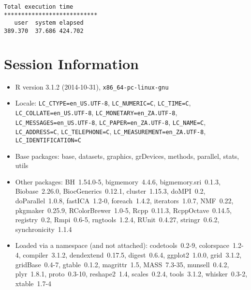 \documentclass[10pt]{article}\usepackage[]{graphicx}\usepackage[]{color}
\begin{document}
\begin{verbatim}
Total execution time
***************************
   user  system elapsed 
389.370  37.686 424.702 

\end{verbatim}

\section*{Session Information}
\begin{itemize}\raggedright
  \item R version 3.1.2 (2014-10-31), \verb|x86_64-pc-linux-gnu|
  \item Locale: \verb|LC_CTYPE=en_US.UTF-8|, \verb|LC_NUMERIC=C|, \verb|LC_TIME=C|, \verb|LC_COLLATE=en_US.UTF-8|, \verb|LC_MONETARY=en_ZA.UTF-8|, \verb|LC_MESSAGES=en_US.UTF-8|, \verb|LC_PAPER=en_ZA.UTF-8|, \verb|LC_NAME=C|, \verb|LC_ADDRESS=C|, \verb|LC_TELEPHONE=C|, \verb|LC_MEASUREMENT=en_ZA.UTF-8|, \verb|LC_IDENTIFICATION=C|
  \item Base packages: base, datasets, graphics, grDevices, methods,
    parallel, stats, utils
  \item Other packages: BH~1.54.0-5, bigmemory~4.4.6,
    bigmemory.sri~0.1.3, Biobase~2.26.0, BiocGenerics~0.12.1,
    cluster~1.15.3, doMPI~0.2, doParallel~1.0.8, fastICA~1.2-0,
    foreach~1.4.2, iterators~1.0.7, NMF~0.22, pkgmaker~0.25.9,
    RColorBrewer~1.0-5, Rcpp~0.11.3, RcppOctave~0.14.5, registry~0.2,
    Rmpi~0.6-5, rngtools~1.2.4, RUnit~0.4.27, stringr~0.6.2,
    synchronicity~1.1.4
  \item Loaded via a namespace (and not attached): codetools~0.2-9,
    colorspace~1.2-4, compiler~3.1.2, dendextend~0.17.5, digest~0.6.4,
    ggplot2~1.0.0, grid~3.1.2, gridBase~0.4-7, gtable~0.1.2,
    magrittr~1.5, MASS~7.3-35, munsell~0.4.2, plyr~1.8.1, proto~0.3-10,
    reshape2~1.4, scales~0.2.4, tools~3.1.2, whisker~0.3-2,
    xtable~1.7-4
\end{itemize}
\end{document}
